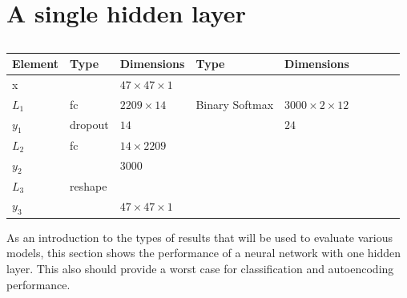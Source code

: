   \section{A single hidden layer}
    \begin{table}[h!]
    \centering
    {\footnotesize
    \begin{tabular}{|lllllllll|}
    \hline
    \multicolumn{1}{|l|}{Element} & Type     & \multicolumn{1}{l|}{Dimensions}                     & Type     & \multicolumn{1}{l|}{Dimensions}                      \\ \hline
    \multicolumn{1}{|l|}{x}       &          & \multicolumn{1}{l|}{$47\times47\times1$}            &          & \multicolumn{1}{l|}{}                                \\ \hline
    \multicolumn{1}{|l|}{$L_1$}   & fc       & \multicolumn{1}{l|}{$2209\times14$}              & Binary Softmax & \multicolumn{1}{l|}{$3000\times2\times12$}        \\
    \multicolumn{1}{|l|}{$y_1$}   & dropout  & \multicolumn{1}{l|}{$14$}                         &          & \multicolumn{1}{l|}{$24$}                              \\ \hline
    \multicolumn{1}{|l|}{$L_2$}   & fc       & \multicolumn{1}{l|}{$14\times2209$}              &          & \multicolumn{1}{l|}{}                                   \\
    \multicolumn{1}{|l|}{$y_2$}   &          & \multicolumn{1}{l|}{$3000$}                         &          & \multicolumn{1}{l|}{}                                \\ \hline
    \multicolumn{1}{|l|}{$L_3$}   & reshape & \multicolumn{1}{l|}{}                    &          & \multicolumn{1}{l|}{}                                \\
    \multicolumn{1}{|l|}{$y_3$}   &          & \multicolumn{1}{l|}{$47\times47\times 1$}          &          & \multicolumn{1}{l|}{}                                \\ \hline
    \end{tabular}

    \caption{} \label{net:simple1}

    }
    \end{table}
    As an introduction to the types of results that will be used to evaluate various
    models, this section shows the performance of a neural network with one
    hidden layer. This also should provide a worst case for classification and autoencoding performance.

